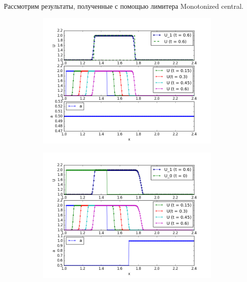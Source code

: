 \documentclass{article}
\begin{document}
\newpage
Рассмотрим результаты, полученные с помощью лимитера Monotonized central.
\begin{figure}[h]
    \caption{Ступенька}
    \begin{subfigure}{0.33\textwidth}
    \includegraphics[width=1\linewidth]{TVD_tests/lim_MC_a_const_U0_step.png}
    \end{subfigure}
    \begin{subfigure}{0.33\textwidth}
    \includegraphics[width=1\linewidth]{TVD_tests/lim_MC_a_devided_U0_step.png}
    \end{subfigure}
    \begin{subfigure}{0.33\textwidth}

\end{subfigure}
\end{figure}
\end{document}
